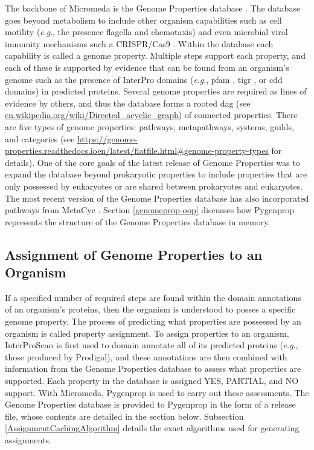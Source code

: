 The backbone of Micromeda is the Genome Properties database \cite{Haft2013}. The 
database goes beyond metabolism to include other organism capabilities such as 
cell motility (\textit{e}.\textit{g}., the presence flagella and chemotaxis) and 
even microbial viral immunity mechanisms such a CRISPR/Cas9 
\cite{horvath2010crispr}. Within the database each capability is called a genome 
property. Multiple steps support each property, and each of these is supported 
by evidence that can be found from an organism's genome such as the presence of 
InterPro domains (\textit{e}.\textit{g}., \gls{pfam} \cite{bateman2004pfam}, 
\gls{tigr} \cite{haft2001tigrfams}, or \gls{cdd} \cite{marchler2014cdd} domains) 
in predicted proteins. Several genome properties are required as lines of 
evidence by others, and thus the database forms a rooted \gls{dag} (see 
\href{http://en.wikipedia.org/wiki/Directed_acyclic_graph}{en.wikipedia.org/wiki/Directed\_acyclic\_graph}) 
of connected properties. There are five types of genome properties: pathways, 
metapathways, systems, guilds, and categories (see 
\href{https://genome-properties.readthedocs.io/en/latest/flatfile.html\#genome-property-types}{https://genome-properties.readthedocs.ioen/latest/flatfile.html\#genome-property-types} 
for details). One of the core goals of the latest release of Genome Properties 
was to expand the database beyond prokaryotic properties to include properties 
that are only possessed by eukaryotes or are shared between prokaryotes and 
eukaryotes. The most recent version of the Genome Properties database has also 
incorporated pathways from MetaCyc \cite{karp2002metacyc}. Section 
\ref{genomeprop-oop} discusses how Pygenprop represents the structure of the 
Genome Properties database in memory.

\subsection{Assignment of Genome Properties to an Organism}

If a specified number of required steps are found within the domain annotations 
of an organism's proteins, then the organism is understood to posses a specific 
genome property. The process of predicting what properties are possessed by an 
organism is called property assignment. To assign properties to an organism, 
InterProScan is first used to domain annotate all of its predicted proteins 
(\textit{e}.\textit{g}., those produced by Prodigal), and these annotations are then combined with 
information from the Genome Properties database to assess what properties are 
supported. Each property in the database is assigned YES, PARTIAL, and NO 
support. With Micromeda, Pygenprop is used to carry out these assessments. The 
Genome Properties database is provided to Pygenprop in the form of a release 
file, whose contents are detailed in the section below. Subsection 
\ref{AssignmentCachingAlgorithm} details the exact algorithms used for 
generating assignments.  

